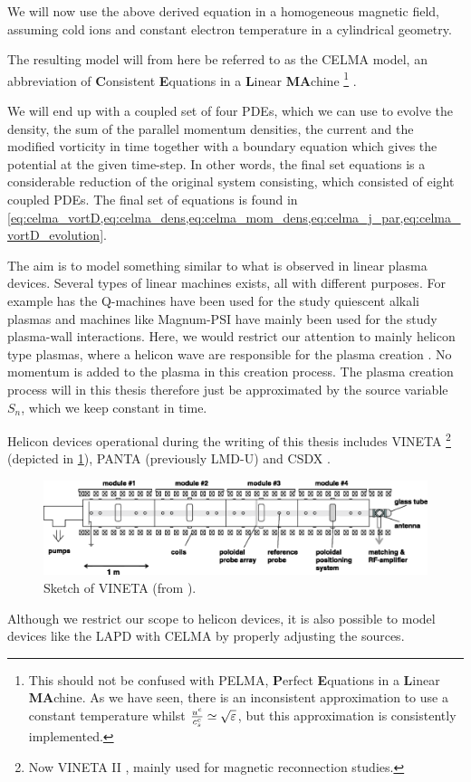 We will now use the above derived equation in a homogeneous magnetic field, assuming cold ions and constant electron temperature in a cylindrical geometry.

The resulting model will from here be referred to as the CELMA model, an abbreviation of \textbf{C}onsistent \textbf{E}quations in a \textbf{L}inear \textbf{MA}chine%
\footnote{
    This should not be confused with PELMA, \textbf{P}erfect \textbf{E}quations in a \textbf{L}inear \textbf{MA}chine.
    As we have seen, there is an inconsistent approximation to use a constant temperature whilst $\frac{u^c}{c^c_s}\simeq\sqrt{\varepsilon}$, but this approximation is consistently implemented.
}%
.

We will end up with a coupled set of four PDEs, which we can use to evolve the density, the sum of the parallel momentum densities, the current and the modified vorticity in time together with a boundary equation which gives the potential at the given time-step.
In other words, the final set equations is a considerable reduction of the original system consisting, which consisted of eight coupled PDEs.
The final set of equations is found in \cref{eq:celma_vortD,eq:celma_dens,eq:celma_mom_dens,eq:celma_j_par,eq:celma_vortD_evolution}.

The aim is to model something similar to what is observed in linear plasma devices.
Several types of linear machines exists, all with different purposes.
For example has the Q-machines have been used for the study quiescent alkali plasmas \cite{Nielsen1996} and machines like Magnum-PSI \cite{Rapp2010} have mainly been used for the study plasma-wall interactions.
Here, we would restrict our attention to mainly helicon type plasmas, where a helicon wave are responsible for the plasma creation \cite{Boswell1984,Shamrai1996}.
No momentum is added to the plasma in this creation process.
The plasma creation process will in this thesis therefore just be approximated by the source variable $S_n$, which we keep constant in time.

Helicon devices operational during the writing of this thesis includes VINETA \cite{Schroder2005}%
\footnote{Now VINETA II \cite{Bohlin2014}, mainly used for magnetic reconnection studies.}%
%
(depicted in \cref{fig:VINETA}), PANTA (previously LMD-U) \cite{Oldenburger2012} and CSDX \cite{Tynan2004a}.
%
\begin{figure}[htb]
    \centering
    \includegraphics[width=1.0\textwidth]{fig/VINETA}
    \caption{Sketch of VINETA (from \cite{Schroder2005}).}
    \label{fig:VINETA}
\end{figure}
%
Although we restrict our scope to helicon devices, it is also possible to model devices like the LAPD \cite{Gekelman1991,Gekelman2016} with CELMA by properly adjusting the sources.

